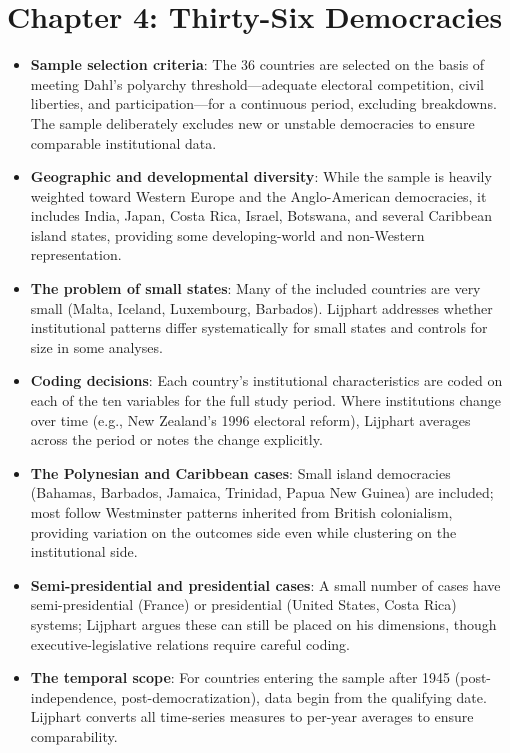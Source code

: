 \documentclass[12pt]{article}
\begin{document}
\section{Chapter 4: Thirty-Six Democracies}

\begin{itemize}[leftmargin=*, itemsep=4pt]
    \item \textbf{Sample selection criteria}: The 36 countries are selected on the basis of meeting Dahl's polyarchy threshold---adequate electoral competition, civil liberties, and participation---for a continuous period, excluding breakdowns. The sample deliberately excludes new or unstable democracies to ensure comparable institutional data.
    \item \textbf{Geographic and developmental diversity}: While the sample is heavily weighted toward Western Europe and the Anglo-American democracies, it includes India, Japan, Costa Rica, Israel, Botswana, and several Caribbean island states, providing some developing-world and non-Western representation.
    \item \textbf{The problem of small states}: Many of the included countries are very small (Malta, Iceland, Luxembourg, Barbados). Lijphart addresses whether institutional patterns differ systematically for small states and controls for size in some analyses.
    \item \textbf{Coding decisions}: Each country's institutional characteristics are coded on each of the ten variables for the full study period. Where institutions change over time (e.g., New Zealand's 1996 electoral reform), Lijphart averages across the period or notes the change explicitly.
    \item \textbf{The Polynesian and Caribbean cases}: Small island democracies (Bahamas, Barbados, Jamaica, Trinidad, Papua New Guinea) are included; most follow Westminster patterns inherited from British colonialism, providing variation on the outcomes side even while clustering on the institutional side.
    \item \textbf{Semi-presidential and presidential cases}: A small number of cases have semi-presidential (France) or presidential (United States, Costa Rica) systems; Lijphart argues these can still be placed on his dimensions, though executive-legislative relations require careful coding.
    \item \textbf{The temporal scope}: For countries entering the sample after 1945 (post-independence, post-democratization), data begin from the qualifying date. Lijphart converts all time-series measures to per-year averages to ensure comparability.
\end{itemize}
\end{document}
